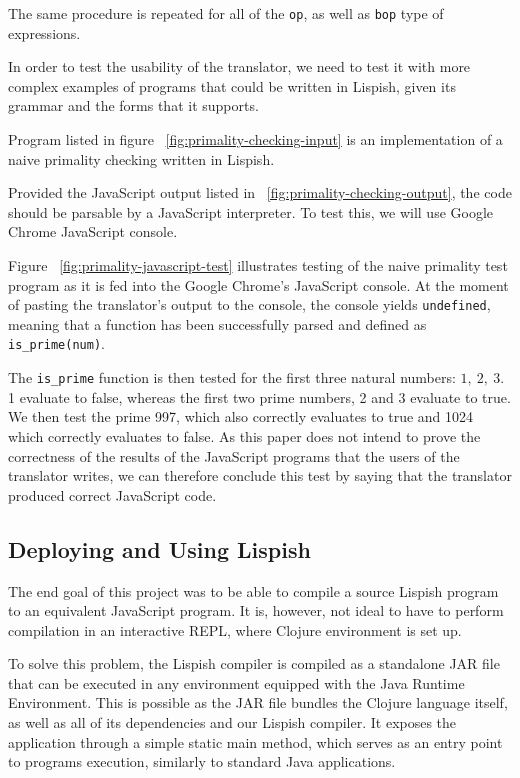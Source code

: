The same procedure is repeated for all of the \texttt{op}, as well as \texttt{bop} type of expressions.


In order to test the usability of the translator, we need to test it with more complex examples of programs that could be written in Lispish, given its grammar and the forms that it supports.



Program listed in figure ~\ref{fig:primality-checking-input} is an implementation of a naive primality checking written in Lispish. 





Provided the JavaScript output listed in ~\ref{fig:primality-checking-output}, the code should be parsable by a JavaScript interpreter. To test this, we will use Google Chrome JavaScript console.



Figure ~\ref{fig:primality-javascript-test} illustrates testing of the naive primality test program as it is fed into the Google Chrome's JavaScript console. 
At the moment of pasting the translator's output to the console, the console yields \texttt{undefined}, meaning that a function has been successfully parsed and defined as \texttt{is\_prime(num)}. 

The \texttt{{is\_prime}} function is then tested for the first three natural numbers: $1, \ 2, \ 3 $. 1 evaluate to false, whereas the first two prime numbers, 2 and 3 evaluate to true. We then test the prime 997, which also correctly evaluates to true and 1024 which correctly evaluates to false. 
As this paper does not intend to prove the correctness of the results of the JavaScript programs that the users of the translator writes, we can therefore conclude this test by saying that the translator produced correct JavaScript code. 

\subsection{Deploying and Using Lispish}
The end goal of this project was to be able to compile a source Lispish program to an equivalent JavaScript program.
It is, however, not ideal to have to perform compilation in an interactive REPL, where Clojure environment is set up. 

To solve this problem, the Lispish compiler is compiled as a standalone JAR file that can be executed in any environment equipped with the Java Runtime Environment. This is possible as the JAR file bundles the Clojure language itself, as well as all of its dependencies and our Lispish compiler. It exposes the application through a simple static main method, which serves as an entry point to programs execution, similarly to standard Java applications. 


